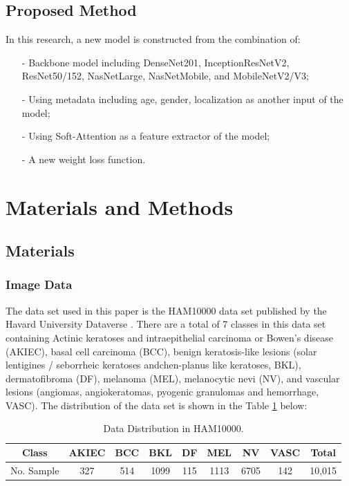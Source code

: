 \documentclass[sensors,article,accept,pdftex,moreauthors]{Definitions/mdpi}
\begin{document}
	\subsection{Proposed Method}
	In this research, a new model is constructed from the combination of:
	
	\begin{itemize}
	\item[-] Backbone model including DenseNet201, InceptionResNetV2, ResNet50/152, NasNetLarge, NasNetMobile, and MobileNetV2/V3;
	\item[-] Using metadata including age, gender, localization as another input of the model;
	\item[-] Using Soft-Attention as a feature extractor of the model;
	\item[-] A new weight loss function.
	\end{itemize}
	\section{Materials and Methods}
	\subsection{Materials}
	\subsubsection{Image Data}
	The data set used in this paper is the HAM10000 data set published by the Havard University Dataverse \cite{10417}. There are a total of 7 classes in this data set containing Actinic keratoses and intraepithelial carcinoma or Bowen's disease (AKIEC), basal cell carcinoma (BCC),  benign keratosis-like lesions (solar lentigines / seborrheic keratoses andchen-planus like keratoses, BKL), dermatofibroma (DF), melanoma (MEL), melanocytic nevi (NV), and vascular lesions (angiomas, angiokeratomas, pyogenic granulomas and hemorrhage, VASC). The distribution of the data set is shown in the Table \ref{table:data-distribution} below:
	
	\begin{table}[H]
		\caption{Data Distribution in HAM10000.}
		\label{table:data-distribution}
		\setlength{\tabcolsep}{3.05mm}\begin{tabular}{c c c c c c c c c} 
\toprule
\textbf{Class} & \textbf{AKIEC} & \textbf{BCC} & \textbf{BKL} & \textbf{DF} & \textbf{MEL} & \textbf{NV} & \textbf{VASC} & \textbf{Total} \\ 
\midrule
No. Sample & 327 & 514 & 1099 & 115 & 1113 & 6705 & 142 & 10,015 \\
\bottomrule
		\end{tabular}
	\end{table}
	
\end{document}
